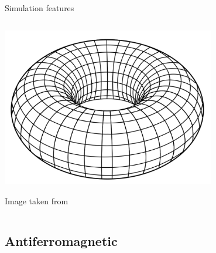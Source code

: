 \documentclass{beamer}
\begin{document}
\begin{frame}{Simulation features}
\begin{columns}
\begin{column}{0.5\textwidth}
    \begin{center}
     \includegraphics[width=0.7\textwidth]{Pic/Torus.png}
      \end{center}
      \begin{center}
          Image taken from \cite{PBC}
     \end{center}

\end{column}
\end{columns}
\end{frame}


\subsection{Antiferromagnetic}
\end{document}
